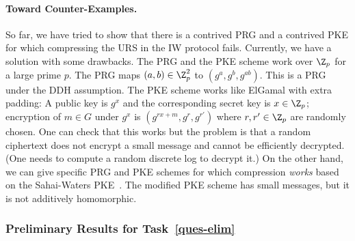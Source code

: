 \paragraph*{Toward Counter-Examples.} So far, we have tried to show that there is a contrived  PRG and a contrived PKE for which compressing the URS in the IW protocol fails. Currently, we have a solution with some drawbacks.  The PRG and the PKE scheme work over $\Z_p$ for a large prime $p$.  The PRG maps $(a,b) \in \Z_p ^2$  to $(g^a,g^b,g^{ab})$.  This is a PRG under the DDH assumption.  The PKE scheme works like ElGamal with  extra padding: A public key is $g^x$ and the corresponding secret key is $x \in \Z_p$; encryption of $m \in G$ under $g^x$ is $(g^{rx + m}, g^r, g^{r'})$ where $r,r' \in \Z_p$ are randomly chosen.  One can check that this works but the problem is that a random ciphertext does not encrypt a small message and cannot be efficiently decrypted. (One needs to compute a random discrete log to decrypt it.)  On the other hand, we can give specific PRG and PKE schemes for which compression \emph{works} based on the Sahai-Waters PKE~\cite{STOC:SahWat14}. The modified  PKE scheme has small messages, but it is not additively homomorphic.
  
 
\subsubsection{Preliminary Results for Task~\ref{ques-elim}}
 
 
 
